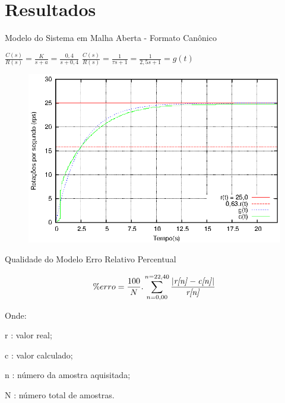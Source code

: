 \section{Resultados}

\begin{frame}{Modelo do Sistema em Malha Aberta - Formato Canônico}

$  \frac{C(s)}{R(s)}=\frac{K}{s+a}=\frac{0,4}{s+0,4} $
\hspace{1cm}
$\frac{C(s)}{R(s)} = \frac{1}{\tau s+1} = \frac{1}{2,5 s+1} = g(t)$

\vspace{-0.5cm}
\begin{figure}[!htb]
\center\includegraphics[scale=0.9]{./imagens/acaoMalhaAbertaTau.eps}
\label{fig:acaoMalhaAberTau}

\end{figure}


\end{frame}




\begin{frame}{Qualidade do Modelo}
Erro Relativo Percentual

\begin{equation}
 \% erro = \frac{100}{N} . \sum_{n = 0,00}^{n=22,40} {\frac{| \text{\emph{r[n]}} -\text{\emph{c[n]}} |}{\text{\emph{r[n]}}} } 
\end{equation}

Onde:

\setlength{\parindent}{2cm}
r : valor real; 

c : valor calculado;

n : número da amostra aquisitada;

N : número total de amostras.


\end{frame}



